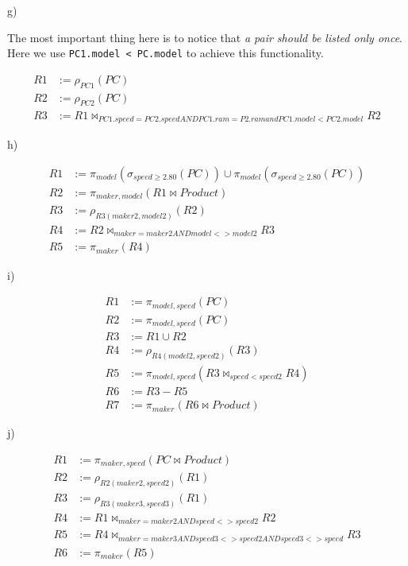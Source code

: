 \documentclass[../../main.tex]{subfiles}
\begin{document}
g)

The most important thing here is to notice that \emph{a pair
should be listed only once}. Here we use \verb|PC1.model < PC.model|
to achieve this functionality.

\begin{align*}
  R1 &:= \rho_{PC1}(PC) \\
  R2 &:= \rho_{PC2}(PC) \\
  R3 &:= R1 \bowtie_{PC1.speed = PC2.speed AND PC1.ram =
         P2.ram and PC1.model < PC2.model} R2
\end{align*}

h)

\begin{align*}
  R1 &:= \pi_{model}(\sigma_{speed \geq 2.80}(PC))
  \cup \pi_{model}(\sigma_{speed \geq 2.80}(PC)) \\
  R2 &:= \pi_{maker, model}(R1 \bowtie Product) \\
  R3 &:= \rho_{R3(maker2, model2)}(R2) \\
  R4 &:= R2 \bowtie_{maker = maker2 AND model <> model2} R3 \\
  R5 &:= \pi_{maker}(R4)
\end{align*}

i)

\begin{align*}
  R1 &:= \pi_{model, speed}(PC) \\
  R2 &:= \pi_{model, speed}(PC) \\
  R3 &:= R1 \cup R2 \\
  R4 &:= \rho_{R4(model2, speed2)}(R3) \\
  R5 &:= \pi_{model, speed}(R3 \bowtie_{speed < speed2} R4) \\
  R6 &:= R3 - R5 \\
  R7 &:= \pi_{maker}(R6 \bowtie Product)
\end{align*}

j)

\begin{align*}
  R1 &:= \pi_{maker, speed}(PC \bowtie Product) \\
  R2 &:= \rho_{R2(maker2, speed2)}(R1) \\
  R3 &:= \rho_{R3(maker3, speed3)}(R1) \\
  R4 &:= R1 \bowtie_{maker = maker2 AND speed <> speed2} R2 \\
  R5 &:= R4 \bowtie_{maker = maker3 AND speed3 <> speed2
         AND speed3 <> speed} R3 \\
  R6 &:= \pi_{maker}(R5)
\end{align*}
\end{document}
